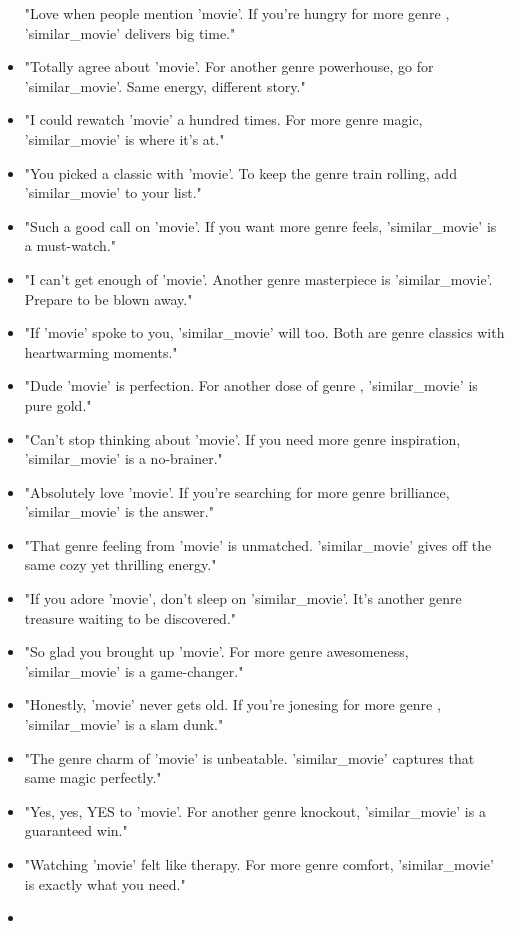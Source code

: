 \begin{LTR}
\begin{itemize}
"Love when people mention '{movie}'. If you’re hungry for more {genre} , '{similar\_movie}' delivers big time."
\item
"Totally agree about '{movie}'. For another {genre} powerhouse, go for '{similar\_movie}'. Same energy, different story."
\item
"I could rewatch '{movie}' a hundred times. For more {genre} magic, '{similar\_movie}' is where it’s at."
\item
"You picked a classic with '{movie}'. To keep the {genre} train rolling, add '{similar\_movie}' to your list."
\item
"Such a good call on '{movie}'. If you want more {genre} feels, '{similar\_movie}' is a must-watch."
\item
"I can’t get enough of '{movie}'. Another {genre} masterpiece is '{similar\_movie}'. Prepare to be blown away."
\item
"If '{movie}' spoke to you, '{similar\_movie}' will too. Both are {genre} classics with heartwarming moments."
\item
"Dude '{movie}' is perfection. For another dose of {genre} , '{similar\_movie}' is pure gold."
\item
"Can’t stop thinking about '{movie}'. If you need more {genre} inspiration, '{similar\_movie}' is a no-brainer."
\item
"Absolutely love '{movie}'. If you’re searching for more {genre} brilliance, '{similar\_movie}' is the answer."
\item
"That {genre} feeling from '{movie}' is unmatched. '{similar\_movie}' gives off the same cozy yet thrilling energy."
\item
"If you adore '{movie}', don’t sleep on '{similar\_movie}'. It’s another {genre} treasure waiting to be discovered."
\item
"So glad you brought up '{movie}'. For more {genre} awesomeness, '{similar\_movie}' is a game-changer."
\item
"Honestly, '{movie}' never gets old. If you’re jonesing for more {genre} , '{similar\_movie}' is a slam dunk."
\item
"The {genre} charm of '{movie}' is unbeatable. '{similar\_movie}' captures that same magic perfectly."
\item
"Yes, yes, YES to '{movie}'. For another {genre} knockout, '{similar\_movie}' is a guaranteed win."
\item
"Watching '{movie}' felt like therapy. For more {genre} comfort, '{similar\_movie}' is exactly what you need."
\item

\end{itemize}
\end{LTR}

